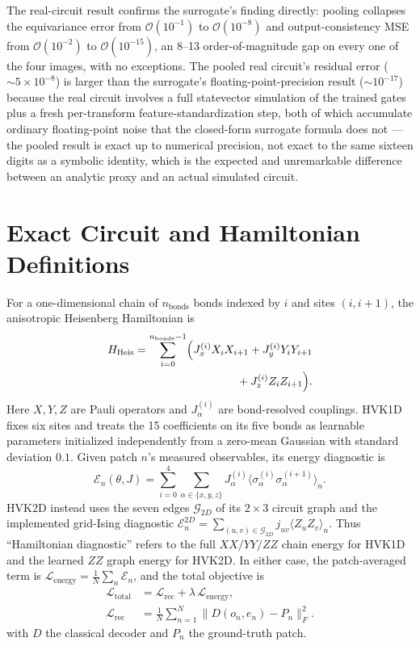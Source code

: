 \documentclass[11pt]{article}
\begin{document}
The real-circuit result confirms the surrogate's finding directly: pooling collapses the equivariance error from $\mathcal{O}(10^{-1})$ to $\mathcal{O}(10^{-8})$ and output-consistency MSE from $\mathcal{O}(10^{-2})$ to $\mathcal{O}(10^{-15})$, an 8--13 order-of-magnitude gap on every one of the four images, with no exceptions. The pooled real circuit's residual error ($\sim\!5\times10^{-8}$) is larger than the surrogate's floating-point-precision result ($\sim\!10^{-17}$) because the real circuit involves a full statevector simulation of the trained gates plus a fresh per-transform feature-standardization step, both of which accumulate ordinary floating-point noise that the closed-form surrogate formula does not --- the pooled result is exact up to numerical precision, not exact to the same sixteen digits as a symbolic identity, which is the expected and unremarkable difference between an analytic proxy and an actual simulated circuit.

\section{Exact Circuit and Hamiltonian Definitions}
\label{sec:supp_exact_circuits}
For a one-dimensional chain of $n_{\text{bonds}}$ bonds indexed by $i$ and sites $(i,i+1)$, the anisotropic Heisenberg Hamiltonian is
\begin{align}
H_{\text{Heis}}=\sum_{i=0}^{n_{\text{bonds}}-1}\Bigl(
J_x^{(i)}X_iX_{i+1}+J_y^{(i)}Y_iY_{i+1}\nonumber\\
{}+J_z^{(i)}Z_iZ_{i+1}\Bigr).
\end{align}
Here $X,Y,Z$ are Pauli operators and $J_\alpha^{(i)}$ are bond-resolved couplings. HVK1D fixes six sites and treats the 15 coefficients on its five bonds as learnable parameters initialized independently from a zero-mean Gaussian with standard deviation $0.1$. Given patch $n$'s measured observables, its energy diagnostic is
\begin{equation}
\mathcal{E}_n(\theta,J) = \sum_{i=0}^{4}\sum_{\alpha\in\{x,y,z\}} J_\alpha^{(i)}\langle\sigma_\alpha^{(i)}\sigma_\alpha^{(i+1)}\rangle_n.
\end{equation}
HVK2D instead uses the seven edges $\mathcal{G}_{2D}$ of its $2\times3$ circuit graph and the implemented grid-Ising diagnostic $\mathcal{E}^{2D}_n=\sum_{(u,v)\in\mathcal{G}_{2D}}j_{uv}\langle Z_uZ_v\rangle_n$. Thus ``Hamiltonian diagnostic'' refers to the full $XX/YY/ZZ$ chain energy for HVK1D and the learned $ZZ$ graph energy for HVK2D. In either case, the patch-averaged term is $\mathcal{L}_{\text{energy}}=\frac{1}{N}\sum_n \mathcal{E}_n$, and the total objective is
\begin{align}
\mathcal{L}_{\text{total}}&=\mathcal{L}_{\text{rec}}
+\lambda\,\mathcal{L}_{\text{energy}},\\
\mathcal{L}_{\text{rec}}&=\frac{1}{N}\sum_{n=1}^{N}
\bigl\|D(o_n,e_n)-P_n\bigr\|_F^2.
\end{align}
with $D$ the classical decoder and $P_n$ the ground-truth patch.
\end{document}

